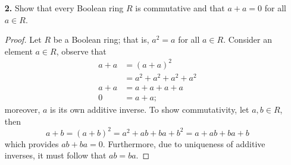 \documentclass[ 12pt ]{article}
\begin{document}
\begin{enumerate}
\begin{proof}
			In regard to multiplication, it is clear that it is also closed and abelian due to the commutativity of the intersection between sets. Hence, we will show only left distributivity: let $A, B, C \in 2^X$, then it follows that
			\begin{align*}
				A \cdot (B + C) &= A \cap ((B - C) \cup (C - B)) \\
				&= (A \cap (B - C)) \cup (A \cap (C - B)) \\
				&= (A \cap B - A \cap C) \cup (A \cap C - A \cap B) \\
				&= (A \cdot B - A \cdot C) \cup (A \cdot C - A \cdot B) \\
				A \cdot (B + C) &= A \cdot B + A \cdot C
			\end{align*}
			provided the distributivity of set intersection and union as well as distributivity of the set intersection and set subtraction. Next, notice that $$A \cdot X = A \cap X = A$$ for any subset $A \subseteq X$ demonstrating that the multiplicative identity of $2^X$ is $X$. Thus, $(2^X, +, \cdot)$ is a commutative ring with identity. \\

			Lastly, we determine all zero divisors of $2^X$. By definition, for a set $\varnothing \neq A \subseteq X$ to be a zero divisor, there must exist a set $\varnothing \neq B \neq X$ such that $A \cap B = \varnothing$. Therefore, $B \subseteq X - A$ and such a $B$ exists if and only if $\varnothing \neq A \subset X$.
		\end{proof}


	\item[\textbf{2.}] Show that every Boolean ring $R$ is commutative and that $a + a = 0$ for all $a \in R$.

		\begin{proof}
			Let $R$ be a Boolean ring; that is, $a^2 = a$ for all $a \in R$. Consider an element $a \in R$, observe that
			\begin{align*}
				a + a &= (a + a)^2 \\
				&= a^2 + a^2 + a^2 + a^2 \\
				a + a &= a + a + a + a \\
				0 &= a + a;
			\end{align*}
			moreover, $a$ is its own additive inverse. To show commutativity, let $a, b \in R$, then $$a + b = (a + b)^2 = a^2 + ab + ba + b^2 = a + ab + ba + b$$ which provides $ab + ba = 0$. Furthermore, due to uniqueness of additive inverses, it must follow that $ab = ba$.
		\end{proof}



\end{enumerate}
\end{document}

